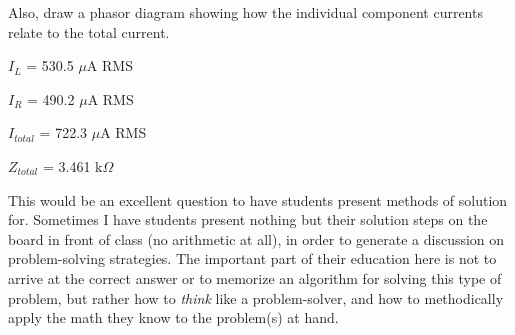 Also, draw a phasor diagram showing how the individual component currents relate to the total current.







$I_L$ = 530.5 $\mu$A RMS

\vskip 10pt

$I_R$ = 490.2 $\mu$A RMS

\vskip 10pt

$I_{total}$ = 722.3 $\mu$A RMS

\vskip 10pt

$Z_{total}$ = 3.461 k$\Omega$







This would be an excellent question to have students present methods of solution for.  Sometimes I have students present nothing but their solution steps on the board in front of class (no arithmetic at all), in order to generate a discussion on problem-solving strategies.  The important part of their education here is not to arrive at the correct answer or to memorize an algorithm for solving this type of problem, but rather how to {\it think} like a problem-solver, and how to methodically apply the math they know to the problem(s) at hand.




